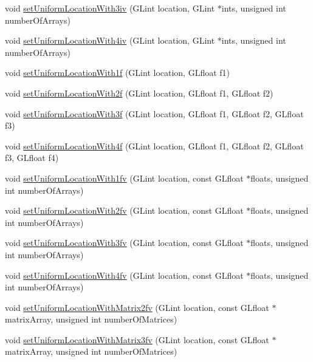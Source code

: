 \begin{DoxyCompactItemize}
\item 
void \hyperlink{classGLProgram_a2fb342d0da47da38ec70fd670af18fe4}{set\+Uniform\+Location\+With3iv} (G\+Lint location, G\+Lint $\ast$ints, unsigned int number\+Of\+Arrays)
\item 
void \hyperlink{classGLProgram_a8d7620f14405cd3fb99d83886ef15775}{set\+Uniform\+Location\+With4iv} (G\+Lint location, G\+Lint $\ast$ints, unsigned int number\+Of\+Arrays)
\item 
void \hyperlink{classGLProgram_a1ad9ce5ccc8d957fe9e01d71ce9560f2}{set\+Uniform\+Location\+With1f} (G\+Lint location, G\+Lfloat f1)
\item 
void \hyperlink{classGLProgram_a3b762779b30cea82590314538843db9a}{set\+Uniform\+Location\+With2f} (G\+Lint location, G\+Lfloat f1, G\+Lfloat f2)
\item 
void \hyperlink{classGLProgram_a33e41cd80fb48e0a57b471f35169783a}{set\+Uniform\+Location\+With3f} (G\+Lint location, G\+Lfloat f1, G\+Lfloat f2, G\+Lfloat f3)
\item 
void \hyperlink{classGLProgram_aae6350415e7f86969daa6de160859cf3}{set\+Uniform\+Location\+With4f} (G\+Lint location, G\+Lfloat f1, G\+Lfloat f2, G\+Lfloat f3, G\+Lfloat f4)
\item 
void \hyperlink{classGLProgram_adeb93361bb46fed7496618d46cd2c176}{set\+Uniform\+Location\+With1fv} (G\+Lint location, const G\+Lfloat $\ast$floats, unsigned int number\+Of\+Arrays)
\item 
void \hyperlink{classGLProgram_a5b6c67eea6ef5f03383d228fb8900a44}{set\+Uniform\+Location\+With2fv} (G\+Lint location, const G\+Lfloat $\ast$floats, unsigned int number\+Of\+Arrays)
\item 
void \hyperlink{classGLProgram_a0df23e97019d9c292a8068bb448f05e3}{set\+Uniform\+Location\+With3fv} (G\+Lint location, const G\+Lfloat $\ast$floats, unsigned int number\+Of\+Arrays)
\item 
void \hyperlink{classGLProgram_a1ec5c5f3d024757f9c35e4bff362a3ee}{set\+Uniform\+Location\+With4fv} (G\+Lint location, const G\+Lfloat $\ast$floats, unsigned int number\+Of\+Arrays)
\item 
void \hyperlink{classGLProgram_a088e08492735e31f94ae29161f6e02d0}{set\+Uniform\+Location\+With\+Matrix2fv} (G\+Lint location, const G\+Lfloat $\ast$matrix\+Array, unsigned int number\+Of\+Matrices)
\item 
void \hyperlink{classGLProgram_a9a9ffe60dcf17ff4fa75d838117f4e93}{set\+Uniform\+Location\+With\+Matrix3fv} (G\+Lint location, const G\+Lfloat $\ast$matrix\+Array, unsigned int number\+Of\+Matrices)

\end{DoxyCompactItemize}
